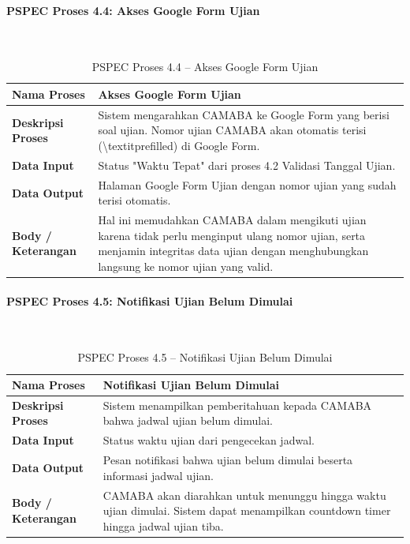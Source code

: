 \paragraph{PSPEC Proses 4.4: Akses Google Form Ujian}~\\
\begin{longtable}{|p{}|p{}|}
	\caption{PSPEC Proses 4.4 -- Akses Google Form Ujian}
	\label{table:3.pspec44}\\
	\hline
	\textbf{Nama Proses} & Akses Google Form Ujian \\
	\hline
	\textbf{Deskripsi Proses} & Sistem mengarahkan CAMABA ke Google Form yang berisi soal ujian. Nomor ujian CAMABA akan otomatis terisi (\textbackslash{}textit{prefilled}) di Google Form. \\
	\hline
	\textbf{Data Input} & Status "Waktu Tepat" dari proses 4.2 Validasi Tanggal Ujian. \\
	\hline
	\textbf{Data Output} & Halaman Google Form Ujian dengan nomor ujian yang sudah terisi otomatis. \\
	\hline
	\textbf{Body / Keterangan} & Hal ini memudahkan CAMABA dalam mengikuti ujian karena tidak perlu menginput ulang nomor ujian, serta menjamin integritas data ujian dengan menghubungkan langsung ke nomor ujian yang valid. \\
	\hline
\end{longtable}

\paragraph{PSPEC Proses 4.5: Notifikasi Ujian Belum Dimulai}~\\
\begin{longtable}{|p{}|p{}|}
	\caption{PSPEC Proses 4.5 -- Notifikasi Ujian Belum Dimulai}
	\label{table:3.pspec45}\\
	\hline
	\textbf{Nama Proses} & Notifikasi Ujian Belum Dimulai \\
	\hline
	\textbf{Deskripsi Proses} & Sistem menampilkan pemberitahuan kepada CAMABA bahwa jadwal ujian belum dimulai. \\
	\hline
	\textbf{Data Input} & Status waktu ujian dari pengecekan jadwal. \\
	\hline
	\textbf{Data Output} & Pesan notifikasi bahwa ujian belum dimulai beserta informasi jadwal ujian. \\
	\hline
	\textbf{Body / Keterangan} & CAMABA akan diarahkan untuk menunggu hingga waktu ujian dimulai. Sistem dapat menampilkan countdown timer hingga jadwal ujian tiba. \\
	\hline
\end{longtable}

